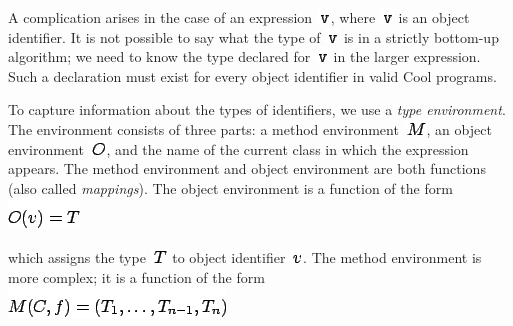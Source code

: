 \documentclass[]{article}
\begin{document}
A complication arises in the case of an expression
\includegraphics{img54.png}, where \includegraphics{img54.png} is an
object identifier. It is not possible to say what the type of
\includegraphics{img54.png} is in a strictly bottom-up algorithm; we
need to know the type declared for \includegraphics{img54.png} in the
larger expression. Such a declaration must exist for every object
identifier in valid Cool programs.

To capture information about the types of identifiers, we use a
\emph{type environment}. The environment consists of three parts: a
method environment \includegraphics{img55.png}, an object environment
\includegraphics{img56.png}, and the name of the current class in which
the expression appears. The method environment and object environment
are both functions (also called \emph{mappings}). The object environment
is a function of the form \\

\includegraphics{img57.png}

which assigns the type \includegraphics{img58.png} to object identifier
\includegraphics{img59.png}. The method environment is more complex; it
is a function of the form \\

\includegraphics{img60.png}
\end{document}
